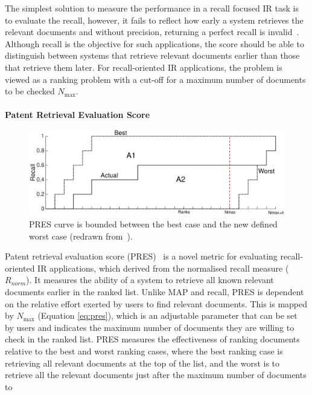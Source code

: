 The simplest solution to measure the performance in a recall focused IR task is to evaluate the recall, however, it fails to reflect how early a system retrieves the relevant documents and without precision, returning a perfect recall is invalid~\citep{Suominen08t.:critical}. Although recall is the objective for such applications, the score should be able to distinguish between systems that retrieve relevant documents earlier than those that retrieve them later. For recall-oriented IR applications, the problem is viewed as a ranking problem with a cut-off for a maximum number of documents to be checked $ N_{\max} $.\\\\
\textbf{Patent Retrieval Evaluation Score}
\ \\
\begin{figure}[t!]
   \centering
   \includegraphics[scale=.31]{figs/pres.eps}
   \caption{PRES curve is bounded between the best case and the new defined worst case (redrawn from~\citep{magdy2010pres}).}  
   \label{fig:pres} 
\end{figure}
%
Patent retrieval evaluation score (PRES)~\citep{magdy2010pres} is a novel metric for evaluating recall-oriented IR applications, which derived from the normalised recall measure ($ R_{norm} $). It measures the ability of a system to retrieve all known relevant documents earlier in the ranked list. Unlike MAP and recall, PRES is dependent on the relative effort exerted by users to find relevant documents. This is mapped by $ N_{\max} $ (Equation \ref{eq:pres}), which is an adjustable parameter that can be set by users and indicates the maximum number of documents they are willing to check in the ranked list. PRES measures the effectiveness of ranking documents relative to the best and worst ranking cases, where the best ranking case is retrieving all relevant documents at the top of the list, and the worst is to retrieve all the relevant documents just after the maximum number of documents to
